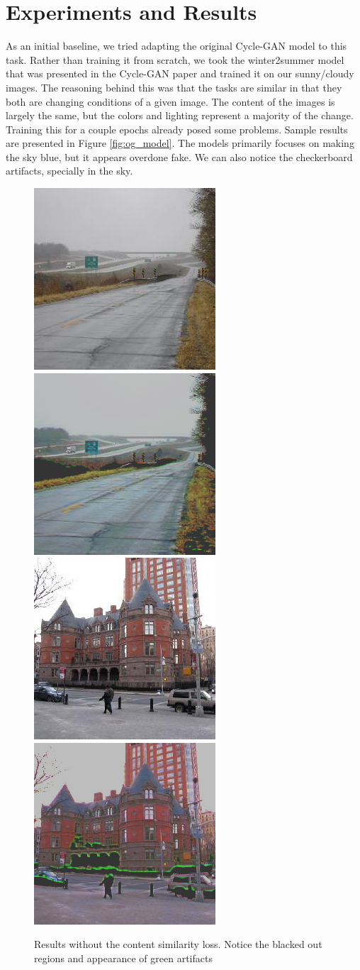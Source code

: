 \documentclass[10pt,twocolumn,letterpaper]{article}
\begin{document}
\section{Experiments and Results}
As an initial baseline, we tried adapting the original Cycle-GAN model \cite{zhu2017unpaired} to this task. Rather than training it from scratch, we took the winter2summer model that was presented in the Cycle-GAN paper and trained it on our sunny/cloudy images. The reasoning behind this was that the tasks are similar in that they both are changing conditions of a given image. The content of the images is largely the same, but the colors and lighting represent a majority of the change. Training this for a couple epochs already posed some problems. Sample results are presented in Figure \ref{fig:og_model}. The models primarily focuses on making the sky blue, but it appears overdone fake. We can also notice the checkerboard artifacts, specially in the sky.

\begin{figure}[tpb]
    \includegraphics[width=.23\textwidth]{images/8_A.png}\hfill
    \includegraphics[width=.23\textwidth]{images/8_A2B.png}
    \\[\smallskipamount]
    \includegraphics[width=.23\textwidth]{images/9_A.png}\hfill
    \includegraphics[width=.23\textwidth]{images/9_A2B.png}
    \caption{Results without the content similarity loss. Notice the blacked out regions and appearance of green artifacts }\label{fig:no_content_sim}
\end{figure}
\end{document}

